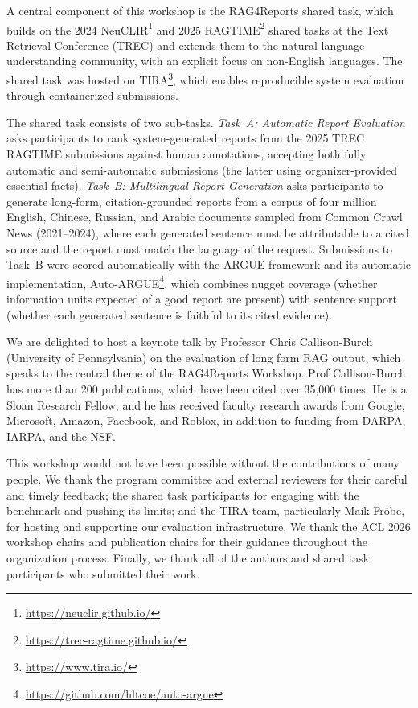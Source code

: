 A central component of this workshop is the RAG4Reports shared task, which
builds on the 2024 NeuCLIR\footnote{\url{https://neuclir.github.io/}} and 
2025 RAGTIME\footnote{\url{https://trec-ragtime.github.io/}} shared tasks at the Text
Retrieval Conference (TREC) and extends them to the natural language
understanding community, with an explicit focus on non-English languages.
The shared task was hosted on TIRA\footnote{\url{https://www.tira.io/}},
which enables reproducible system evaluation through containerized
submissions.

The shared task consists of two sub-tasks. \emph{Task~A: Automatic Report
Evaluation} asks participants to rank system-generated reports from the
2025 TREC RAGTIME submissions against human annotations, accepting both
fully automatic and semi-automatic submissions (the latter using
organizer-provided essential facts). \emph{Task~B: Multilingual Report
Generation} asks participants to generate long-form, citation-grounded
reports from a corpus of four million English, Chinese, Russian, and Arabic
documents sampled from Common Crawl News (2021--2024), where each generated
sentence must be attributable to a cited source and the report must match
the language of the request. Submissions to Task~B were scored
automatically with the ARGUE framework and
its automatic implementation, Auto-ARGUE\footnote{\url{https://github.com/hltcoe/auto-argue}}, 
which combines nugget coverage
(whether information units expected of a good report are present) with
sentence support (whether each generated sentence is faithful to its cited
evidence).

We are delighted to host a keynote talk by Professor Chris Callison-Burch (University
of Pennsylvania) on the evaluation of long form RAG output, which speaks to the central 
theme of the RAG4Reports Workshop. Prof Callison-Burch has more than 200 
publications, which have been cited over 35,000 times. He is a Sloan Research Fellow, 
and he has received faculty research awards from Google, Microsoft, Amazon, Facebook, 
and Roblox, in addition to funding from DARPA, IARPA, and the NSF.

This workshop would not have been possible without the contributions of many
people. We thank the program committee and external reviewers for their
careful and timely feedback; the shared task participants for engaging with
the benchmark and pushing its limits; and the TIRA team, particularly Maik Fröbe,
for hosting and supporting our evaluation infrastructure. 
We thank the ACL 2026 workshop chairs and
publication chairs for their guidance throughout the organization process. 
Finally, we thank all of the authors and shared task participants who submitted
their work. 


